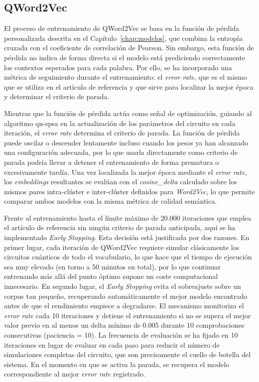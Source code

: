 \subsection{QWord2Vec}

El proceso de entrenamiento de QWord2Vec se basa en la función de pérdida personalizada descrita en el Capítulo~\ref{chap:modelos}, que combina la entropía cruzada con el coeficiente de correlación de Pearson. Sin embargo, esta función de pérdida no indica de forma directa si el modelo está prediciendo correctamente los contextos esperados para cada palabra. Por ello, se ha incorporado una métrica de seguimiento durante el entrenamiento: el \textit{error rate}, que es el mismo que se utiliza en el artículo de referencia \cite{ohno_qword2vec_2025} y que sirve para localizar la mejor época y determinar el criterio de parada.

Mientras que la función de pérdida actúa como señal de optimización, guiando al algoritmo \gls{qn-spsa} en la actualización de los parámetros del circuito en cada iteración, el \textit{error rate} determina el criterio de parada. La función de pérdida puede oscilar o descender lentamente incluso cuando los pesos ya han alcanzado una configuración adecuada, por lo que usarla directamente como criterio de parada podría llevar a detener el entrenamiento de forma prematura o excesivamente tardía. Una vez localizada la mejor época mediante el \textit{error rate}, los \textit{embeddings} resultantes se evalúan con el \textit{cosine\_delta} calculado sobre los mismos pares intra-clúster e inter-clúster definidos para \textit{Word2Vec}, lo que permite comparar ambos modelos con la misma métrica de calidad semántica.

Frente al entrenamiento hasta el límite máximo de 20.000 iteraciones que emplea el artículo de referencia \cite{ohno_qword2vec_2025} sin ningún criterio de parada anticipada, aquí se ha implementado \textit{Early Stopping}. Esta decisión está justificada por dos razones. En primer lugar, cada iteración de QWord2Vec requiere simular clásicamente los circuitos cuánticos de todo el vocabulario, lo que hace que el tiempo de ejecución sea muy elevado (en torno a 50 minutos en total), por lo que continuar entrenando más allá del punto óptimo supone un coste computacional innecesario. En segundo lugar, el \textit{Early Stopping} evita el sobreajuste sobre un corpus tan pequeño, recuperando automáticamente el mejor modelo encontrado antes de que el rendimiento empiece a degradarse. El mecanismo monitoriza el \textit{error rate} cada 10 iteraciones y detiene el entrenamiento si no se supera el mejor valor previo en al menos un delta mínimo de $0.005$ durante 10 comprobaciones consecutivas (paciencia = 10). La frecuencia de evaluación se ha fijado en 10 iteraciones en lugar de evaluar en cada paso para reducir el número de simulaciones completas del circuito, que son precisamente el cuello de botella del sistema. En el momento en que se activa la parada, se recupera el modelo correspondiente al mejor \textit{error rate} registrado.

